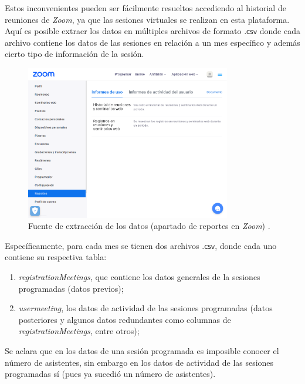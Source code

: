 \documentclass[11pt,a4paper]{book}
\theoremstyle{definition}%
\begin{document}
                Estos inconvenientes pueden ser fácilmente resueltos accediendo al historial de reuniones de \textit{Zoom}, ya que las sesiones virtuales se realizan en esta plataforma. Aquí es posible extraer los datos en múltiples archivos de formato $\mathsf{.csv}$ donde cada archivo contiene los datos de las sesiones en relación a un mes específico y además cierto tipo de información de la sesión.
                
                \begin{figure}[H]
                    \centering
                    \includegraphics[width=0.8\textwidth]{Sources/zoomReport.png}
                    \caption{Fuente de extracción de los datos (apartado de reportes en \textit{Zoom}) \cite{zoom:reports}.}
                    \label{fig:zoomReport}
                \end{figure}

                Específicamente, para cada mes se tienen dos archivos $\mathsf{.csv}$, donde cada uno contiene su respectiva tabla:
                \begin{enumerate}\label{raw tables dict}
                    \item \textit{registrationMeetings}, que contiene los datos generales de la sesiones programadas (datos previos);
                    \item \textit{usermeeting}, los datos de actividad de las sesiones programadas (datos posteriores y algunos datos redundantes como columnas de \textit{registrationMeetings}, entre otros);
                \end{enumerate}
                
                Se aclara que en los datos de una sesión programada es imposible conocer el número de asistentes, sin embargo en los datos de actividad de las sesiones programadas sí (pues ya sucedió un número de asistentes).
    
\end{document}
